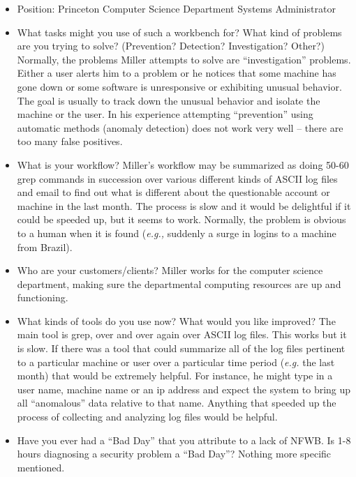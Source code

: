 \documentclass{article}
\begin{document}
\begin{itemize}
\item Position: Princeton Computer Science Department Systems Administrator

\item What tasks might you use of such a workbench for?  
What kind of problems are you trying to solve?  
(Prevention?  Detection?  Investigation?  Other?)
Normally, the problems Miller attempts to solve are ``investigation'' problems.
Either a user alerts him to a problem or he notices that some machine
has gone down or some software is unresponsive or exhibiting unusual
behavior.  The goal is usually to track down the unusual behavior and
isolate the machine or the user.  In his experience attempting
``prevention'' using automatic methods (anomaly detection) 
does not work very well --
there are too many false positives.

\item What is your workflow?  Miller's workflow may be summarized as
doing 50-60 grep commands in succession over various different kinds of
ASCII log files and email to find out what is different
about the questionable account or machine in the last month.
The process is slow and it would be delightful if it could be speeded up,
but it seems to work.  Normally, the problem is obvious to a human
when it is found ({\em e.g.,} suddenly a surge in logins to a machine
from Brazil).

\item Who are your customers/clients?  Miller works for the computer science 
department, making sure the departmental computing resources are up and 
functioning.

\item What kinds of tools do you use now?  
What would you like improved?
The main tool is grep, 
over and over again over ASCII log files.
This works but it is slow.  If there was a tool that could
summarize all of the log files pertinent to a particular machine or
user over a particular time period ({\em e.g.} the last month)
that would be extremely helpful.  For instance, he might type in
a user name, machine name or an ip address and expect the system to bring up
all ``anomalous'' data relative to that name.  Anything that
speeded up the process of collecting and analyzing log files 
would be helpful.

\item Have you ever had a ``Bad Day'' that you attribute to a lack of 
NFWB.  Is 1-8 hours diagnosing a security problem a ``Bad Day''?  Nothing
more specific mentioned.


\end{itemize}
\end{document}
